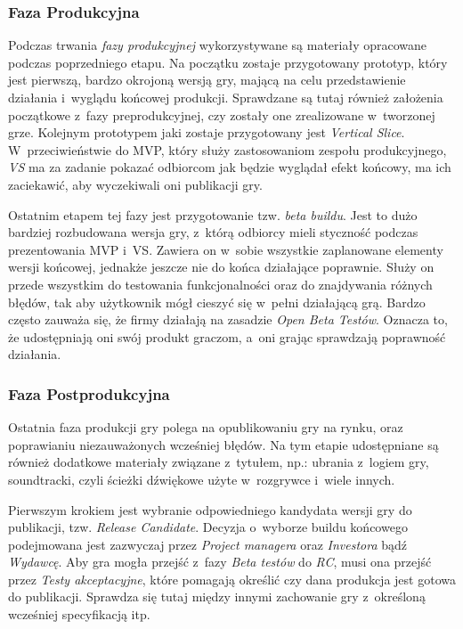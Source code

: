 \documentclass[12pt,a4paper,oneside]{book}
\theoremstyle{definition}
\numberwithin{equation}{chapter}
\begin{document}
\subsubsection{Faza Produkcyjna}
\par Podczas trwania \textit{fazy produkcyjnej} wykorzystywane są materiały opracowane podczas poprzedniego etapu. Na początku zostaje przygotowany prototyp, który jest pierwszą, bardzo okrojoną wersją gry, mającą na celu przedstawienie działania i~wyglądu końcowej produkcji. Sprawdzane są tutaj również założenia początkowe z~fazy preprodukcyjnej, czy zostały one zrealizowane w~tworzonej grze. Kolejnym prototypem jaki zostaje przygotowany jest \textit{Vertical Slice}. W~przeciwieństwie do MVP, który służy zastosowaniom zespołu produkcyjnego, \textit{VS} ma za zadanie pokazać odbiorcom jak będzie wyglądał efekt końcowy, ma ich zaciekawić, aby wyczekiwali oni publikacji gry.

\par Ostatnim etapem tej fazy jest przygotowanie tzw. \textit{beta buildu}. Jest to dużo bardziej rozbudowana wersja gry, z~którą odbiorcy mieli styczność podczas prezentowania MVP i~VS. Zawiera on w~sobie wszystkie zaplanowane elementy wersji końcowej, jednakże jeszcze nie do końca działające poprawnie. Służy on przede wszystkim do testowania funkcjonalności oraz do znajdywania różnych błędów, tak aby użytkownik mógł cieszyć się w~pełni działającą grą. Bardzo często zauważa się, że firmy działają na zasadzie \textit{Open Beta Testów}. Oznacza to, że udostępniają oni swój produkt graczom, a~oni grając sprawdzają poprawność działania.

\subsubsection{Faza Postprodukcyjna}
\par Ostatnia faza produkcji gry polega na opublikowaniu gry na rynku, oraz poprawianiu niezauważonych wcześniej błędów. Na tym etapie udostępniane są również dodatkowe materiały związane z~tytułem, np.: ubrania z~logiem gry, soundtracki, czyli ścieżki dźwiękowe użyte w~rozgrywce i~wiele innych.

\par Pierwszym krokiem jest wybranie odpowiedniego kandydata wersji gry do publikacji, tzw. \textit{Release Candidate}. Decyzja o~wyborze buildu końcowego podejmowana jest zazwyczaj przez \textit{Project managera} oraz \textit{Investora} bądź \textit{Wydawcę}. Aby gra mogła przejść z~fazy \textit{Beta testów} do \textit{RC}, musi ona przejść przez \textit{Testy akceptacyjne}\cite{TestyAkceptacyjne}, które pomagają określić czy dana produkcja jest gotowa do publikacji. Sprawdza się tutaj między innymi zachowanie gry z~określoną wcześniej specyfikacją itp.
\end{document}
